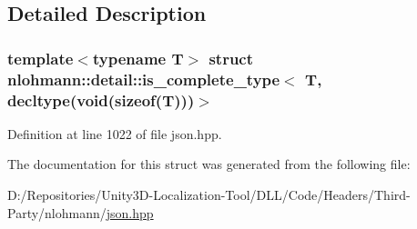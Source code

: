 \subsection{Detailed Description}
\subsubsection*{template$<$typename T$>$\newline
struct nlohmann\+::detail\+::is\+\_\+complete\+\_\+type$<$ T, decltype(void(sizeof(\+T)))$>$}



Definition at line 1022 of file json.\+hpp.



The documentation for this struct was generated from the following file\+:\begin{DoxyCompactItemize}
\item 
D\+:/\+Repositories/\+Unity3\+D-\/\+Localization-\/\+Tool/\+D\+L\+L/\+Code/\+Headers/\+Third-\/\+Party/nlohmann/\mbox{\hyperlink{json_8hpp}{json.\+hpp}}\end{DoxyCompactItemize}
